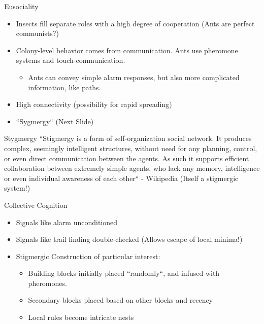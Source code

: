 \documentclass{beamer}
\begin{document}
  \begin{frame}{Eusociality}
      \begin{itemize}
          \item Insects fill separate roles with a high degree of cooperation \tiny (Ants are perfect communists?) \normalsize
          \item Colony-level behavior comes from communication. Ants use pheromone systems and touch-communication.
              \begin{itemize}
                  \item Ants can convey simple alarm responses, but also more complicated information, like paths.
              \end{itemize}
          \item High connectivity (possibility for rapid spreading)
          \item ``Sygmergy`` (Next Slide)
      \end{itemize}
  \end{frame}

  \begin{frame}{Stygmergy}
      ``Stigmergy is a form of self-organization social network. It produces complex, seemingly intelligent structures, without need for any planning, control, or even direct communication between the agents. As such it supports efficient collaboration between extremely simple agents, who lack any memory, intelligence or even individual awareness of each other`` - Wikipedia (Itself a stigmergic system!)
  \end{frame} 

  \begin{frame}{Collective Cognition}
      \begin{itemize}
          \item Signals like alarm unconditioned
          \item Signals like trail finding double-checked \tiny (Allows escape of local minima!) \normalsize
          \item Stigmergic Construction of particular interest:
              \begin{itemize}
                  \item Building blocks initially placed ``randomly``, and infused with pheromones.
                  \item Secondary blocks placed based on other blocks and recency
                  \item Local rules become intricate nests
              \end{itemize}
      \end{itemize}
  \end{frame}
\end{document}
